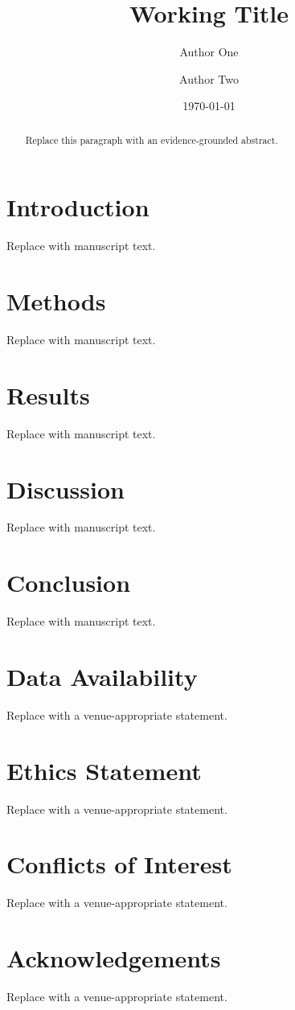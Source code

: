 \documentclass[11pt]{article}
\title{Working Title}
\author{Author One \and Author Two}
\date{\today}
\begin{document}
\maketitle

\begin{abstract}
Replace this paragraph with an evidence-grounded abstract.
\end{abstract}

\section{Introduction}
Replace with manuscript text.

\section{Methods}
Replace with manuscript text.

\section{Results}
Replace with manuscript text.

\section{Discussion}
Replace with manuscript text.

\section{Conclusion}
Replace with manuscript text.

\section*{Data Availability}
Replace with a venue-appropriate statement.

\section*{Ethics Statement}
Replace with a venue-appropriate statement.

\section*{Conflicts of Interest}
Replace with a venue-appropriate statement.

\section*{Acknowledgements}
Replace with a venue-appropriate statement.



\end{document}
